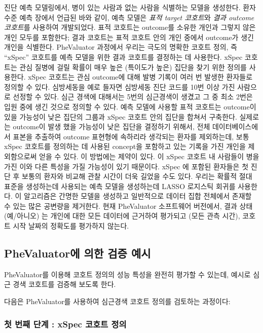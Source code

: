 \documentclass[10.5pt]{book}
\theoremstyle{definition}
\theoremstyle{definition}
\theoremstyle{definition}
\theoremstyle{remark}
\begin{document}
진단 예측 모델링에서, 병이 있는 사람과 없는 사람을 식별하는 모델을
생성한다. 환자 수준 예측 장에서 언급된 바와 같이, 예측 모델은 \emph{표적
target 코호트}와 \emph{결과 outcome 코호트}를 사용하여 개발되었다. 표적
코호트는 outcome를 소유한 개인과 그렇지 않은 개인 모두를 포함한다; 결과
코호트는 표적 코호트 안의 개인 중에서 outcome가 생긴 개인을 식별한다.
PheValuator 과정에서 우리는 극도의 명확한 코호트 정의, 즉 ``xSpec''
코호트를 예측 모델을 위한 결과 코호트를 결정하는 데 사용한다. xSpec
코호트는 관심 질병에 걸릴 확률이 매우 높은 (특이도가 높은) 집단을 찾기
위한 정의를 사용한다. xSpec 코호트는 관심 outcome에 대해 발병 기록이
여러 번 발생한 환자들로 정의할 수 있다. 심방세동을 예로 들자면 심방세동
진단 코드를 10번 이상 가진 사람으로 선정할 수 있다. 심근 경색에 대해서는
5번의 심근경색이 생겼고 그 중 최소 2번은 입원 중에 생긴 것으로 정의할 수
있다. 예측 모델에 사용할 표적 코호트는 outcome이 있을 가능성이 낮은
집단의 그룹과 xSpec 코호트 안의 집단을 합쳐서 구축한다. 실제로는
outcome이 발생 했을 가능성이 낮은 집단을 결정하기 위해서, 전체
데이터베이스에서 표본을 추출하여 outcome 표현형에 속하리라 생각되는
환자를 제외하는데, 보통 xSpec 코호트를 정의하는 데 사용된 concept을
포함하고 있는 기록을 가진 개인을 제외함으로써 얻을 수 있다. 이 방법에는
제약이 있다. 이 xSpec 코호트 내 사람들이 병을 가진 이와 다른 특성을 가질
가능성이 있기 때문이다. xSpec 에 포함된 환자들은 첫 진단 후 보통의
환자와 비교해 관찰 시간이 더욱 길었을 수도 있다. 우리는 확률적 절대
표준을 생성하는데 사용되는 예측 모델을 생성하는데 LASSO 로지스틱 회귀를
사용한다. \citep{suchard_2013} 이 알고리즘은 간명한 모델을 생성하고
일반적으로 데이터 집합 전체에서 존재할 수 있는 많은 공변량을 제거한다.
현재 PheValuator 소프트웨어 버전에서, 결과 상태 (예/아니오) 는 개인에
대한 모든 데이터에 근거하여 평가되고 (모든 관측 시간), 코호트 시작
날짜의 정확도를 평가하지 않는다.

\subsection{PheValuator에 의한 검증 예시}\label{phevaluator---}

PheValuator를 이용해 코호트 정의의 성능 특성을 완전히 평가할 수 있는데,
예시로 심근 경색 코호트를 검증해 보도록 한다.

다음은 PheValuator를 사용하여 심근경색 코호트 정의를 검토하는 과정이다:

\subsubsection*{첫 번째 단계 : xSpec 코호트 정의}\label{---xspec--}
\end{document}
